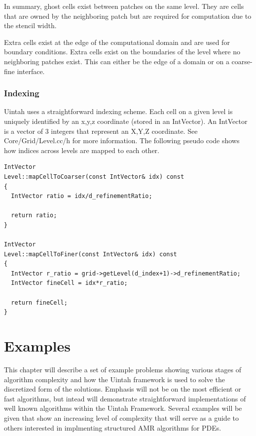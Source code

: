 \documentclass[12pt]{report}
\begin{document}
In summary, ghost cells exist between patches on the same level.  They are cells that are owned by the neighboring patch but are required for computation due to the stencil width.

Extra cells exist at the edge of the computational domain and are used for boundary conditions.  Extra cells exist on the boundaries of the level where no neighboring patches exist. This can either be the edge of a domain or on a coarse-fine interface.

\subsection{Indexing}

Uintah uses a straightforward indexing scheme. Each cell on a given level is uniquely identified by an x,y,z coordinate (stored in an IntVector).  An IntVector is a vector of 3 integers that represent an X,Y,Z coordinate.  See Core/Grid/Level.cc/h for more information.  The following pseudo code shows how indices across levels are mapped to each other.

\begin{verbatim}
IntVector
Level::mapCellToCoarser(const IntVector& idx) const
{ 
  IntVector ratio = idx/d_refinementRatio;
  
  return ratio;
}

IntVector
Level::mapCellToFiner(const IntVector& idx) const
{
  IntVector r_ratio = grid->getLevel(d_index+1)->d_refinementRatio;
  IntVector fineCell = idx*r_ratio;

  return fineCell;
}
\end{verbatim}






\chapter{Examples}


This chapter will describe a set of example problems showing various
stages of algorithm complexity and how the Uintah framework is used to
solve the discretized form of the solutions.  Emphasis will not be on
the most efficient or fast algorithms, but intead will demonstrate
straightforward implementations of well known algorithms within the
Uintah Framework.  Several examples will be given that show an
increasing level of complexity that will serve as a guide to others
interested in implmenting structured AMR algorithms for PDEs.
\end{document}
